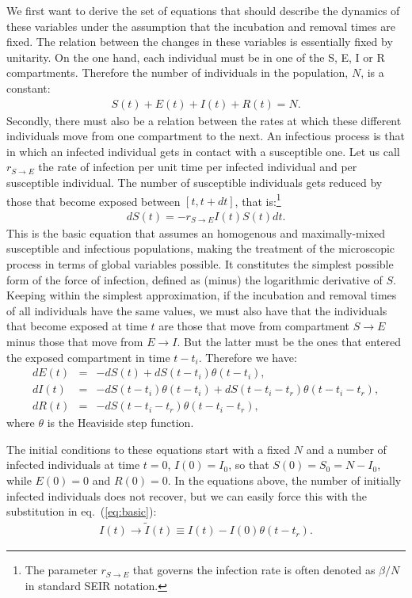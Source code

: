 \documentclass[10pt,letterpaper]{article}
\newcommand{\mychange}[2]{\textcolor[rgb]{0.75,0,0}{\st{#1} {#2}}}
\begin{document}
We first want to derive the set of equations that should describe the dynamics of these variables under the assumption that the incubation and removal times are fixed. The relation between the changes in these variables is essentially fixed by unitarity. On the one hand, each individual must be in one of the S, E, I or R compartments. Therefore the number of  individuals in the population, $N$, is a constant:
\begin{eqnarray}
S(t)+ E(t)+I(t)+R(t) = N.
\end{eqnarray}
Secondly, there must also be a relation between the rates at which these different individuals move from one {compartment} to the next. An infectious process is that in which an infected individual gets in contact with a susceptible one. Let us call $r_{S\rightarrow E}$ the rate of infection per unit time
per infected individual and per susceptible individual. The number of susceptible individuals gets reduced by those that become exposed between $[t, t+dt]$, that is:\footnote{\mychange{}{The parameter $r_{S\rightarrow E}$ that governs the infection rate is often denoted as $\beta/N$ in standard SEIR notation.}}
\begin{eqnarray}
d S(t) = - r_{S\rightarrow E} I(t) S(t) dt.
\label{eq:basic}
\end{eqnarray}
This is the basic equation that assumes an homogenous and maximally-mixed susceptible and infectious populations, making the treatment of the microscopic process in terms of global variables possible. It 
 constitutes the simplest possible form of the force of infection, defined as (minus) the logarithmic derivative of $S$. 
Keeping within the simplest approximation, if the incubation and removal times of all individuals have the same values, we must also have that the individuals that become exposed at time
$t$ are those that move from compartment $S\rightarrow E$  minus those that move from $E\rightarrow I$. But the latter must be the ones that entered the exposed compartment in time $t-t_i$. Therefore we have:
\begin{eqnarray}
d E(t) &=& -d S(t) + d S(t-t_i) \theta(t-t_i) ,\nonumber\\
d I(t) &=& -d S(t-t_i) \theta(t-t_i)+ d S(t-t_i-t_r) \theta(t-t_i-t_r),\label{eqs:cor}\\
d R(t) &=& - d S(t - t_i - t_r) \theta(t-t_i-t_r),\nonumber
\end{eqnarray}
\mychange{}{where $\theta$ is the Heaviside step function.}

The initial conditions to these equations start with a fixed $N$ and a number of infected individuals at time $t=0$, $I(0)= I_0$, so that $S(0)=S_0 = N-I_0$, while $E(0)=0$ and $R(0)=0$.
In the  equations above, the number of initially infected individuals does not recover, but we can easily force this with the substitution in eq.~(\ref{eq:basic}):
\begin{eqnarray}
I(t) \rightarrow \tilde{I}(t) \equiv I(t) - I(0) \theta(t-t_r).
\end{eqnarray}
\end{document}
